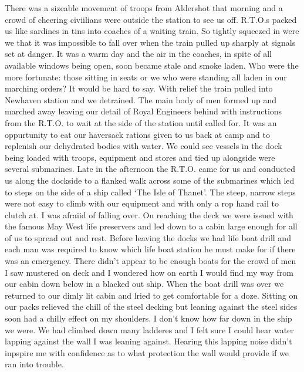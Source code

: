 There was a sizeable movement of troops from Aldershot that morning
and a crowd of cheering civiilians were outside the station to see us
off. R.T.O.s packed us like sardines in tins into coaches of a waiting
train. So tightly squeezed in were we that it was impossible to fall
over when the train pulled up sharply at signals set at danger. It was
a warm day and the air in the coaches, in spite of all available
windows being open, soon became stale and smoke laden. Who were the
more fortunate: those sitting in seats or we who were standing all
laden in our marching orders? It would be hard to say. With relief the
train pulled into Newhaven station and we detrained. The main body of
men formed up and marched away leaving our detail of Royal Engineers
behind with instructions from the R.T.O. to wait at the side of the
station until called for. It was an oppurtunity to eat our haversack
rations given to us back at camp and to replenish our dehydrated
bodies with water. We could see vessels in the dock being loaded with
troops, equipment and stores and tied up alongside were several
submarines. Late in the afternoon the R.T.O. came for us and conducted
us along the dockside to a flanked walk across some of the submarines
which led to steps on the side of a ship called `The Isle of
Thanet'. The steep, narrow steps were not easy to climb with our
equipment and with only a rop hand rail to clutch at. I was afraiid of
falling over. On reaching the deck we were issued with the famous May
West life preservers and led down to a cabin large enough for all of
us to spread out and rest. Before leaving the docks we had life boat
drill and each man was required to know which life boat station he
must make for if there was an emergency. There didn't appear to be
enough boats for the crowd of men I saw mustered on deck and I
wondered how on earth I would find my way from our cabin down below in
a blacked out ship. When the boat drill was over we returned to our
dimly lit cabin and lried to get comfortable for a doze. Sitting on
our packs relieved the chill of the steel decking but leaning against
the steel sides soon had a chilly effect on my shoulders. I don't know
how far down in the ship we were. We had climbed down many ladderes
and I felt sure I could hear water lapping against the wall I was
leaning against. Hearing this lapping noise didn't inpspire me with
confidence as to what protection the wall would provide if we ran into
trouble.
